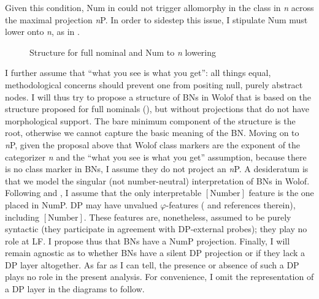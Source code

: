 \documentclass[output=paper]{langscibook}
\begin{document}
Given this condition, Num in  could not trigger allomorphy in the class in \textit{n} across the maximal projection \textit{n}P. In order to sidestep this issue, I stipulate Num must lower \citep{embick2001movement} onto \textit{n}, as in .\largerpage
			
\begin{figure}
    \caption{Structure for full nominal and Num to \textit{n} lowering}
    \label{fig:FoOlNomFGgg}
\end{figure}
			
I further assume that ``what you see is what you get'': all things equal, methodological concerns should prevent one from positing null, purely abstract nodes. I will thus try to propose a structure of BNs in Wolof that is based on the structure proposed for full nominals (), but without projections that do not have morphological support. The bare minimum component of the structure is the root, otherwise we cannot capture the basic meaning of the BN. Moving on to \textit{n}P, given the proposal above that Wolof class markers are the exponent of the categorizer \textit{n} and the ``what you see is what you get'' assumption, because there is no class marker in BNs, I assume they do not project an \textit{n}P. A desideratum is that we model the singular (not number-neutral) interpretation of BNs in Wolof. Following \citet{ritter1991} and \citet{harbour2011valence}, I assume that the only interpretable $[\mbox{Number}]$ feature is the one placed in NumP. DP may have unvalued $\varphi$-features (\citealt{harbour2011valence} and references therein), including $[\mbox{Number}]$. These features are, nonetheless, assumed to be purely syntactic (they participate in agreement with DP-external probes); they play no role at LF. I propose thus that BNs have a NumP projection. Finally, I will remain agnostic as to whether BNs have a silent DP projection or if they lack a DP layer altogether. As far as I can tell, the presence or absence of such a DP plays no role in the present analysis. For convenience, I omit the representation of a DP layer in the diagrams to follow.
\end{document}
